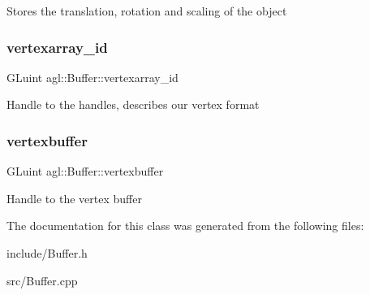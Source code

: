 Stores the translation, rotation and scaling of the object \mbox{\label{classagl_1_1Buffer_a957aca2a128e4b512eb858cdea749da1}} 
\subsubsection{\texorpdfstring{vertexarray\_id}{vertexarray\_id}}
{\footnotesize\ttfamily G\+Luint agl\+::\+Buffer\+::vertexarray\+\_\+id\hspace{0.3cm}{\ttfamily [private]}}

Handle to the handles, describes our vertex format \mbox{\label{classagl_1_1Buffer_a634615ef5cf03ede6e3afe31a6fc5723}} 
\subsubsection{\texorpdfstring{vertexbuffer}{vertexbuffer}}
{\footnotesize\ttfamily G\+Luint agl\+::\+Buffer\+::vertexbuffer\hspace{0.3cm}{\ttfamily [private]}}

Handle to the vertex buffer 

The documentation for this class was generated from the following files\+:\begin{DoxyCompactItemize}
\item 
include/Buffer.\+h\item 
src/Buffer.\+cpp\end{DoxyCompactItemize}

